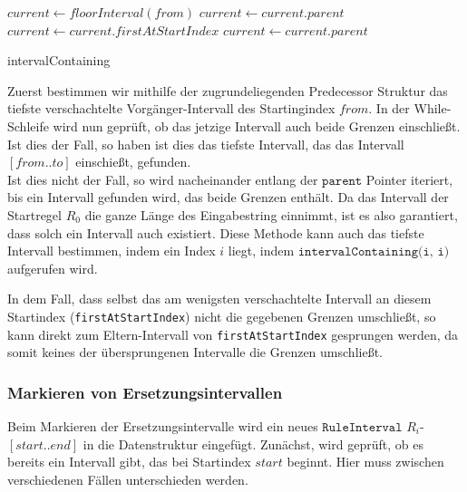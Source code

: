 \begin{algorithm}
    $current \leftarrow floorInterval(from)$\;
     {
         {
        }
         {
            $current \leftarrow current.parent$\;
        }{
            $current \leftarrow current.firstAtStartIndex$\;
             {
                $current \leftarrow current.parent$ 
            }
        }
    }
    \KwRet{\KwNull}
    \caption{intervalContaining}
\end{algorithm}

Zuerst bestimmen wir mithilfe der zugrundeliegenden Predecessor Struktur das tiefste verschachtelte Vorgänger-Intervall des Startingindex $from$. 
In der While-Schleife wird nun geprüft, ob das jetzige Intervall auch beide Grenzen einschließt. Ist dies der Fall, so haben ist dies das tiefste Intervall, das das Intervall $[from..to]$ einschießt, gefunden.\\
Ist dies nicht der Fall, so wird nacheinander entlang der $\texttt{parent}$ Pointer iteriert, bis ein Intervall gefunden wird, das beide Grenzen enthält. Da das Intervall der Startregel $R_0$ die ganze Länge des Eingabestring einnimmt, ist es also garantiert, dass solch ein Intervall auch existiert. Diese Methode kann auch das tiefste Intervall bestimmen, indem ein Index $i$ liegt, indem $\texttt{intervalContaining(i, i)}$ aufgerufen wird.

In dem Fall, dass selbst das am wenigsten verschachtelte Intervall an diesem Startindex (\texttt{firstAtStartIndex}) nicht die gegebenen Grenzen umschließt, so kann direkt zum Eltern-Intervall von \texttt{firstAtStartIndex} gesprungen werden, da somit keines der übersprungenen Intervalle die Grenzen umschließt. 

\subsubsection{Markieren von Ersetzungsintervallen}

Beim Markieren der Ersetzungsintervalle wird ein neues $\texttt{RuleInterval}$ $R_i$-$[start..end]$ in die Datenstruktur eingefügt. 
Zunächst, wird geprüft, ob es bereits ein Intervall gibt, das bei Startindex $start$ beginnt.
Hier muss zwischen verschiedenen Fällen unterschieden werden.

